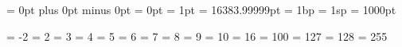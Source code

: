 
\def\newhelp#1#2{\newtoks#1#1\expandafter{\csname#2\endcsname}}


\newcount   \scratchcounter   \newcount  \globalscratchcounter
\newdimen   \scratchdimen     \newdimen  \globalscratchdimen
\newskip    \scratchskip      \newskip   \globalscratchskip
\newmuskip  \scratchmuskip    \newmuskip \globalscratchmuskip
\newtoks    \scratchtoks      \newtoks   \globalscratchtoks
\newbox     \scratchbox       \newbox    \globalscratchbox

\newcount\scratchcounterone  \newcount\scratchcountertwo  \newcount\scratchcounterthree
\newdimen  \scratchdimenone  \newdimen  \scratchdimentwo  \newdimen  \scratchdimenthree
\newdimen   \scratchskipone  \newdimen   \scratchskiptwo  \newdimen   \scratchskipthree
\newbox   \scratchmuskipone  \newbox   \scratchmuskiptwo  \newbox   \scratchmuskipthree
\newtoks    \scratchtoksone  \newtoks    \scratchtokstwo  \newtoks    \scratchtoksthree
\newbox      \scratchboxone  \newbox      \scratchboxtwo  \newbox      \scratchboxthree


\newskip \zeroskip     \zeroskip     = 0pt plus 0pt minus 0pt
\newdimen\zeropoint    \zeropoint    = 0pt
\newdimen\onepoint     \onepoint     = 1pt
\newdimen\maxdimen     \maxdimen     = 16383.99999pt
\newdimen\onebasepoint \onebasepoint = 1bp
\newdimen\scaledpoint  \scaledpoint  = 1sp
\newdimen\thousandpoint\thousandpoint= 1000pt

\let\points\onepoint

\newtoks \emptytoks


\newcount   \minustwo \minustwo =    -2
\chardef    \plustwo            =     2
\chardef    \plusthree          =     3
\chardef    \plusfour           =     4
\chardef    \plusfive           =     5
\chardef    \plussix            =     6
\chardef    \plusseven          =     7
\chardef    \pluseight          =     8
\chardef    \plusnine           =     9
\chardef    \plusten            =    10
\chardef    \plussixteen        =    16
\chardef    \plushundred        =   100
\chardef    \pluscxxvii         =   127
\chardef    \pluscxxviii        =   128
\chardef    \pluscclv           =   255

